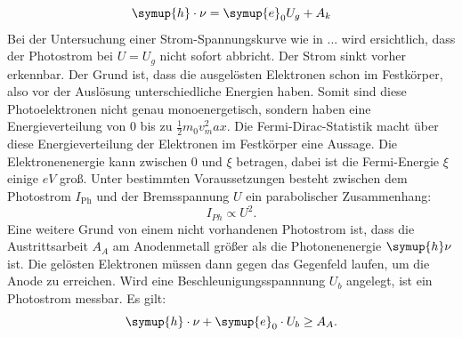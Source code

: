 \begin{equation}\label{eqn:furb}
    \symup{h} \cdot \nu = \symup{e}_0 U_g + A_k
\end{equation}
\noindent
Bei der Untersuchung einer Strom-Spannungskurve wie in ... wird ersichtlich, dass der Photostrom bei $U = U_g$ nicht sofort abbricht.
Der Strom sinkt vorher erkennbar.
Der Grund ist, dass die ausgelösten Elektronen schon im Festkörper, also vor der Auslösung unterschiedliche Energien haben.
Somit sind diese Photoelektronen nicht genau monoenergetisch, sondern haben eine Energieverteilung von 0 bis zu $\frac{1}{2} m_0 v^2_max$.
Die Fermi-Dirac-Statistik macht über diese Energieverteilung der Elektronen im Festkörper eine Aussage.
Die Elektronenenergie kann zwischen 0 und $\xi$  betragen, dabei ist die Fermi-Energie $\xi$ einige $eV$ groß.
Unter bestimmten Voraussetzungen besteht zwischen dem Photostrom $I_\text{Ph}$ und der Bremsspannung $U$ ein parabolischer Zusammenhang:
\begin{equation*}
    I_{Ph} \propto U^2.
\end{equation*}
Eine weitere Grund von einem nicht vorhandenen Photostrom ist, dass die Austrittsarbeit $A_A$ am Anodenmetall größer als die Photonenenergie $\symup{h} \nu$ ist.
Die gelösten Elektronen müssen dann gegen das Gegenfeld laufen, um die Anode zu erreichen.
Wird eine Beschleunigungsspannnung $U_b$ angelegt, ist ein Photostrom messbar.
Es gilt:
\begin{equation}
    \symup{h} \cdot \nu + \symup{e}_0 \cdot U_b \geq A_A.
\end{equation}